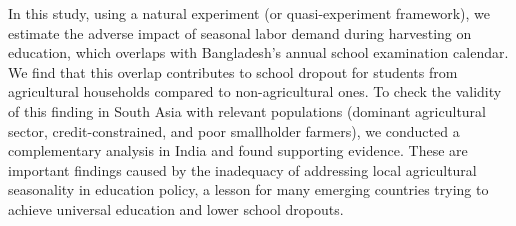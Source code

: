 \documentclass[12pt,letterpaper]{article}
\newcommand{\0}{\ensuremath{\mbox{\boldmath $0$}}}
\begin{document}
In this study, using a natural experiment (or quasi-experiment framework), we estimate the adverse impact of seasonal labor demand during harvesting on education, which overlaps with Bangladesh’s annual school examination calendar. We find that this overlap contributes to school dropout for students from agricultural households compared to non-agricultural ones. To check the validity of this finding in South Asia with relevant populations (dominant agricultural sector, credit-constrained, and poor smallholder farmers), we conducted a complementary analysis in India and found supporting evidence. These are important findings caused by the inadequacy of addressing local agricultural seasonality in education policy, a lesson for many emerging countries trying to achieve universal education and lower school dropouts.

\end{document}

